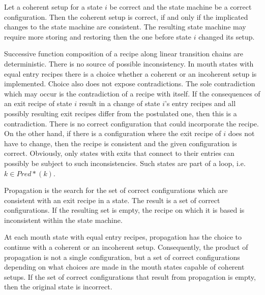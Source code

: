 \documentclass[12pt,a4paper]{scrartcl}
\begin{document}
Let a coherent setup for a state $i$ be correct and the state
machine be a correct configuration. Then the coherent setup is correct, if and
only if the implicated changes to the state machine are consistent. The
resulting state machine may require more storing and restoring then the one
before state $i$ changed its setup. 


Successive function composition of a recipe along linear transition chains are
deterministic. There is no source of possible inconsistency. In mouth states
with equal entry recipes there is a choice whether a coherent or an incoherent
setup is implemented. Choice also does not expose contradictions.  The sole
contradiction which may occur is the contradiction of a recipe with itself. If
the consequences of an exit recipe of state $i$ result in a change of state
$i$'s entry recipes and all possibly resulting exit recipes differ from the
postulated one, then this is a contradiction. There is no correct configuration
that could incorporate the recipe. On the other hand, if there is a
configuration where the exit recipe of $i$ does not have to change, then the
recipe is consistent and the given configuration is correct. Obviously,
only states with exits that connect to their entries can possibly 
be subject to such inconsistencies. Such states are part of a loop, i.e.
$k\in Pred*(k)$.

Propagation is the search for the set of correct configurations which
are consistent with an exit recipe in a state. The result is a set of
correct configurations. If the resulting set is empty, the recipe on
which it is based is inconsistent within the state machine. 

At each mouth state with equal entry recipes, propagation has the choice to
continue with a coherent or an incoherent setup. Consequently, the product of
propagation is not a single configuration, but a set of correct configurations
depending on what choices are made in the mouth states capable of coherent
setups. If the set of correct configurations that result from propagation
is empty, then the original state is incorrect.
\end{document}
